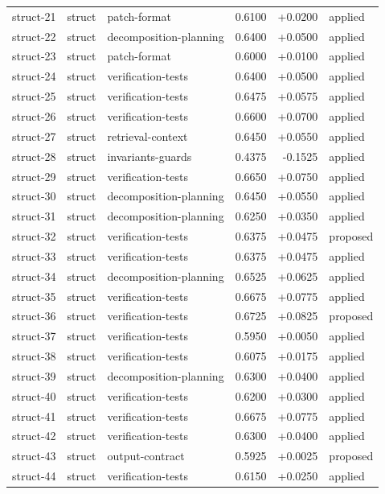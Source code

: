 \begin{center}
\begin{longtable}{llp{5.2cm}rrl}
struct-21 & struct & patch-format & 0.6100 & +0.0200 & applied \\
struct-22 & struct & decomposition-planning & 0.6400 & +0.0500 & applied \\
struct-23 & struct & patch-format & 0.6000 & +0.0100 & applied \\
struct-24 & struct & verification-tests & 0.6400 & +0.0500 & applied \\
struct-25 & struct & verification-tests & 0.6475 & +0.0575 & applied \\
struct-26 & struct & verification-tests & 0.6600 & +0.0700 & applied \\
struct-27 & struct & retrieval-context & 0.6450 & +0.0550 & applied \\
struct-28 & struct & invariants-guards & 0.4375 & -0.1525 & applied \\
struct-29 & struct & verification-tests & 0.6650 & +0.0750 & applied \\
struct-30 & struct & decomposition-planning & 0.6450 & +0.0550 & applied \\
struct-31 & struct & decomposition-planning & 0.6250 & +0.0350 & applied \\
struct-32 & struct & verification-tests & 0.6375 & +0.0475 & proposed \\
struct-33 & struct & verification-tests & 0.6375 & +0.0475 & applied \\
struct-34 & struct & decomposition-planning & 0.6525 & +0.0625 & applied \\
struct-35 & struct & verification-tests & 0.6675 & +0.0775 & applied \\
struct-36 & struct & verification-tests & 0.6725 & +0.0825 & proposed \\
struct-37 & struct & verification-tests & 0.5950 & +0.0050 & applied \\
struct-38 & struct & verification-tests & 0.6075 & +0.0175 & applied \\
struct-39 & struct & decomposition-planning & 0.6300 & +0.0400 & applied \\
struct-40 & struct & verification-tests & 0.6200 & +0.0300 & applied \\
struct-41 & struct & verification-tests & 0.6675 & +0.0775 & applied \\
struct-42 & struct & verification-tests & 0.6300 & +0.0400 & applied \\
struct-43 & struct & output-contract & 0.5925 & +0.0025 & proposed \\
struct-44 & struct & verification-tests & 0.6150 & +0.0250 & applied \\

\end{longtable}
\end{center}
